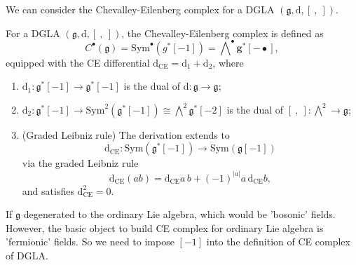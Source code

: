 \documentclass[10pt]{article}
\begin{document}
We can consider the Chevalley-Eilenberg complex for a DGLA $\left( \mathfrak{g}, \mathrm{d} , [~,~] \right)$.

\begin{definition}
  For a DGLA $\left( \mathfrak{g}, \mathrm{d} , [~,~] \right)$, the Chevalley-Eilenberg complex is defined as
  \begin{equation*}
    C^{\bullet}(\mathfrak{g}) = \mathrm{Sym}^{\bullet}\left( g^{*}[-1] \right) = \bigwedge\nolimits^{\bullet} \mathbf{g}^{*} [-\bullet],
  \end{equation*}
  equipped with the CE differential $ \mathrm{d} _{\mathrm{CE}} = \mathrm{d}_1+\mathrm{d}_2$, where
  \begin{enumerate}[(1)]
    \item $ \mathrm{d}_1: \mathfrak{g}^{*}[-1] \rightarrow \mathfrak{g}^{*}[-1]$ is the dual of $ \mathrm{d} : \mathfrak{g} \rightarrow \mathfrak{g}$;
    \item $ \mathrm{d}_2 : \mathfrak{g}^{*}[-1] \rightarrow \mathrm{Sym}^{2} \left( \mathfrak{g}^{*}[-1] \right) \cong \bigwedge\nolimits^{2} \mathfrak{g}^{*}[-2]$ is the dual of $[~,~]: \bigwedge^{2} \rightarrow \mathfrak{g}$;
    \item (Graded Leibniz rule) The derivation extends to
      \begin{equation*}
        \mathrm{d} _{\mathrm{CE}} : \mathrm{Sym}(\mathfrak{g}^{*}[-1]) \rightarrow \mathrm{Sym}(\mathfrak{g}[-1])
      \end{equation*}
      via the graded Leibniz rule
      \begin{equation*}
        \mathrm{d} _{\mathrm{CE}}(ab) = \mathrm{d} _{\mathrm{CE}} a \, b + (-1)^{|a|} a \, \mathrm{d} _{\mathrm{CE}} b,
      \end{equation*}
      and satisfies $ \mathrm{d} _{\mathrm{CE}}^{2} = 0$.
  \end{enumerate}
\end{definition}
\begin{remark}
  If $ \mathfrak{g}$ degenerated to the ordinary Lie algebra, which would be 'bosonic' fields.
  However, the basic object to build CE complex for ordinary Lie algebra is 'fermionic' fields. So we need to impose $[-1]$ into the definition of CE complex of DGLA.
\end{remark}
\end{document}
